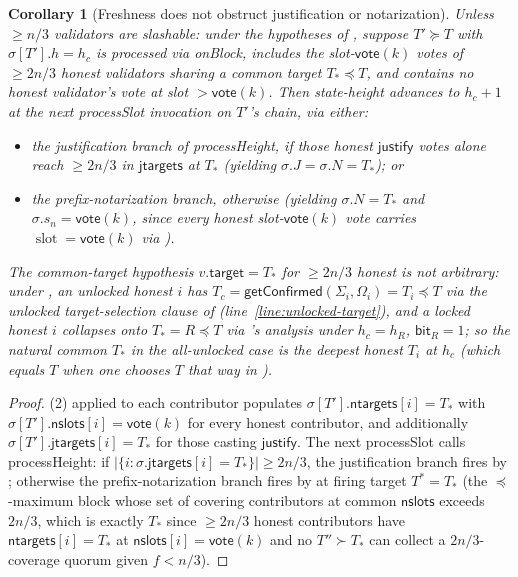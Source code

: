 \documentclass{article}
\newcommand{\slot}[0]{\ensuremath{\operatorname{\mathrm{slot}}}}
\newcommand{\target}{\mathsf{target}}
\newcommand{\just}{\ensuremath{\mathsf{justify}}\xspace}
\newcommand{\jtargets}{\mathsf{jtargets}}
\newcommand{\ntargets}{\mathsf{ntargets}}
\newcommand{\nslots}{\mathsf{nslots}}
\newcommand{\bit}{\mathsf{bit}}
\newcommand{\vote}{\mathsf{vote}}
\newcommand{\processSlot}{\textsf{processSlot}\xspace}
\newcommand{\processHeight}{\textsf{processHeight}\xspace}
\newcommand{\onBlock}{\textsf{onBlock}\xspace}
\newcommand{\getConfirmed}{\textsf{getConfirmed}\xspace}
\theoremstyle{plain}
\newtheorem{corollary}{Corollary}
\theoremstyle{definition}
\theoremstyle{remark}
\begin{document}
\begin{corollary}[Freshness does not obstruct justification or notarization]\label{cor:freshness-liveness}
Unless $\geq n/3$ validators are slashable: under the hypotheses of , suppose $T' \succeq T$ with $\sigma[T'].h = h_c$ is processed via \onBlock, includes the slot-$\vote(k)$ votes of $\geq 2n/3$ honest validators sharing a common target $T_\ast \preceq T$, and contains no honest validator's vote at slot $> \vote(k)$.
Then state-height advances to $h_c + 1$ at the next \processSlot invocation on $T'$'s chain, via either:
\begin{itemize}
  \item the justification branch of \processHeight, if those honest \just votes alone reach $\geq 2n/3$ in $\jtargets$ at $T_\ast$ (yielding $\sigma.J = \sigma.N = T_\ast$); or
  \item the prefix-notarization branch, otherwise (yielding $\sigma.N = T_\ast$ and $\sigma.s_n = \vote(k)$, since every honest slot-$\vote(k)$ vote carries $\slot = \vote(k)$ via ).
\end{itemize}
The common-target hypothesis $v.\target = T_\ast$ for $\geq 2n/3$ honest is not arbitrary: under , an unlocked honest $i$ has $T_c = \getConfirmed(\Sigma_i, \Omega_i) = T_i \preceq T$ via the unlocked target-selection clause of  (line~\ref{line:unlocked-target}), and a locked honest $i$ collapses onto $T_\ast = R \preceq T$ via 's analysis under $h_c = h_R$, $\bit_R = 1$; so the natural common $T_\ast$ in the all-unlocked case is the deepest honest $T_i$ at $h_c$ (which equals $T$ when one chooses $T$ that way in ).
\end{corollary}

\begin{proof}
(2) applied to each contributor populates $\sigma[T'].\ntargets[i] = T_\ast$ with $\sigma[T'].\nslots[i] = \vote(k)$ for every honest contributor, and additionally $\sigma[T'].\jtargets[i] = T_\ast$ for those casting \just.
The next \processSlot calls \processHeight: if $|\{i : \sigma.\jtargets[i] = T_\ast\}| \geq 2n/3$, the justification branch fires by ; otherwise the prefix-notarization branch fires by  at firing target $T^\ast = T_\ast$ (the $\preceq$-maximum block whose set of covering contributors at common $\nslots$ exceeds $2n/3$, which is exactly $T_\ast$ since $\geq 2n/3$ honest contributors have $\ntargets[i] = T_\ast$ at $\nslots[i] = \vote(k)$ and no $T'' \succ T_\ast$ can collect a $2n/3$-coverage quorum given $f < n/3$).
\end{proof}
\end{document}
